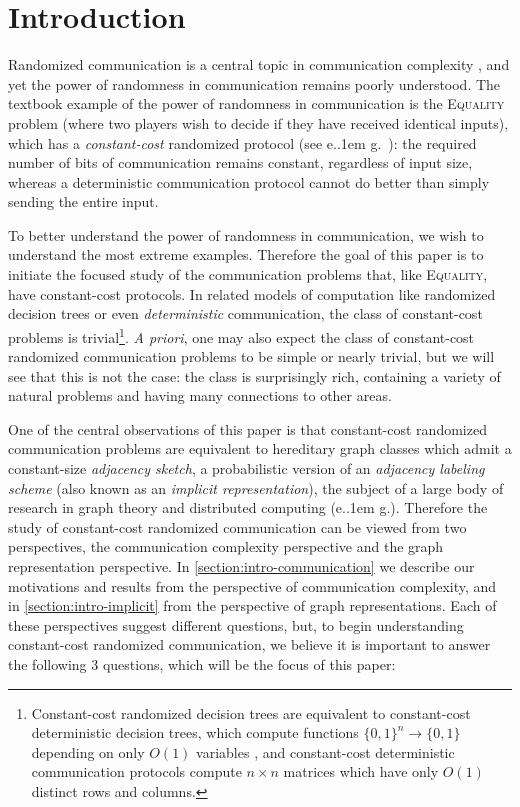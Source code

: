 \documentclass{article}
\makeatletter
\newcommand{\zo}{\{0,1\}}
\newcommand*\eg{e.\kern.1em g.\@\xspace} %
\makeatother
\begin{document}

\section{Introduction}

Randomized communication is a central topic in communication complexity
\cite{GPW18,CLV19,PSW20,HHH23dimfree}, and yet the power of randomness in communication remains
poorly understood. The textbook example of the power of randomness in communication is the
\textsc{Equality} problem (where two players wish to decide if they have received identical inputs),
which has a \emph{constant-cost} randomized protocol (see \eg~\cite{NK96}): the required number of
bits of communication remains constant, regardless of input size, whereas a deterministic
communication protocol cannot do better than simply sending the entire input.

To better understand the power of randomness in communication, we wish to understand the most
extreme examples. Therefore the goal of this paper is to initiate the focused study of the
communication problems that, like \textsc{Equality}, have constant-cost protocols. In related models
of computation like randomized decision trees or even \emph{deterministic} communication, the class
of constant-cost problems is trivial\footnote{Constant-cost randomized decision trees are equivalent
to constant-cost deterministic decision trees, which compute functions $\zo^n \to \zo$ depending on
only $O(1)$ variables \cite{BdW02}, and constant-cost deterministic communication protocols compute
$n \times n$ matrices which have only $O(1)$ distinct rows and columns.}. \emph{A priori}, one may
also expect the class of constant-cost randomized communication problems to be simple or nearly
trivial, but we will see that this is not the case: the class is surprisingly rich, containing a
variety of natural problems and having many connections to other areas.

One of the central observations of this paper is that constant-cost randomized communication
problems are equivalent to hereditary graph classes which admit a constant-size \emph{adjacency sketch}, a
probabilistic version of an \emph{adjacency labeling scheme} (also known as an \emph{implicit
representation}), the subject of a large body of research in graph theory and distributed computing
(\eg \cite{KNR92,FK09,KM12,ACLZ15,Har20,BGK+21a,DEG+21,HH22}). Therefore the study of constant-cost
randomized communication can be viewed from two perspectives, the communication complexity perspective and the
graph representation perspective. In \cref{section:intro-communication} we describe our motivations
and results from the perspective of communication complexity, and in \cref{section:intro-implicit}
from the perspective of graph representations. Each of these perspectives suggest different
questions, but, to begin understanding constant-cost randomized communication, we believe it is
important to answer the following 3 questions, which will be the focus of this paper:
\end{document}
